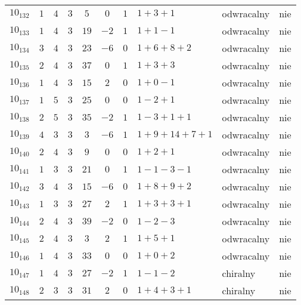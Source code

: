 \begin{longtable}{lccccccllc}
$10_{132}$  &  $1$     &  $4$  &  $3$      &  $5$    &  $0$   &  $1$  &  $1+3+1$        &  odwracalny  &  nie  \\
$10_{133}$  &  $1$     &  $4$  &  $3$      &  $19$   &  $-2$  &  $1$  &  $1+1-1$        &  odwracalny  &  nie  \\
$10_{134}$  &  $3$     &  $4$  &  $3$      &  $23$   &  $-6$  &  $0$  &  $1+6+8+2$      &  odwracalny  &  nie  \\
$10_{135}$  &  $2$     &  $4$  &  $3$      &  $37$   &  $0$   &  $1$  &  $1+3+3$        &  odwracalny  &  nie  \\
$10_{136}$  &  $1$     &  $4$  &  $3$      &  $15$   &  $2$   &  $0$  &  $1+0-1$        &  odwracalny  &  nie  \\
$10_{137}$  &  $1$     &  $5$  &  $3$      &  $25$   &  $0$   &  $0$  &  $1-2+1$        &  odwracalny  &  nie  \\
$10_{138}$  &  $2$     &  $5$  &  $3$      &  $35$   &  $-2$  &  $1$  &  $1-3+1+1$      &  odwracalny  &  nie  \\
$10_{139}$  &  $4$     &  $3$  &  $3$      &  $3$    &  $-6$  &  $1$  &  $1+9+14+7+1$   &  odwracalny  &  nie  \\
$10_{140}$  &  $2$     &  $4$  &  $3$      &  $9$    &  $0$   &  $0$  &  $1+2+1$        &  odwracalny  &  nie  \\
$10_{141}$  &  $1$     &  $3$  &  $3$      &  $21$   &  $0$   &  $1$  &  $1-1-3-1$      &  odwracalny  &  nie  \\
$10_{142}$  &  $3$     &  $4$  &  $3$      &  $15$   &  $-6$  &  $0$  &  $1+8+9+2$      &  odwracalny  &  nie  \\
$10_{143}$  &  $1$     &  $3$  &  $3$      &  $27$   &  $2$   &  $1$  &  $1+3+3+1$      &  odwracalny  &  nie  \\
$10_{144}$  &  $2$     &  $4$  &  $3$      &  $39$   &  $-2$  &  $0$  &  $1-2-3$        &  odwracalny  &  nie  \\
$10_{145}$  &  $2$     &  $4$  &  $3$      &  $3$    &  $2$   &  $1$  &  $1+5+1$        &  odwracalny  &  nie  \\
$10_{146}$  &  $1$     &  $4$  &  $3$      &  $33$   &  $0$   &  $0$  &  $1+0+2$        &  odwracalny  &  nie  \\
$10_{147}$  &  $1$     &  $4$  &  $3$      &  $27$   &  $-2$  &  $1$  &  $1-1-2$        &  chiralny    &  nie  \\
$10_{148}$  &  $2$     &  $3$  &  $3$      &  $31$   &  $2$   &  $0$  &  $1+4+3+1$      &  chiralny    &  nie  \\

\end{longtable}
